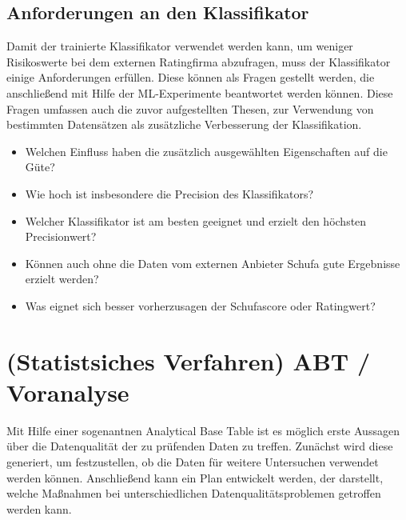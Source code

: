 \subsection{Anforderungen an den Klassifikator}
Damit der trainierte Klassifikator verwendet werden kann, um weniger Risikoswerte bei dem externen Ratingfirma abzufragen, muss der Klassifikator einige Anforderungen erfüllen.
Diese können als Fragen gestellt werden, die anschließend mit Hilfe der ML-Experimente beantwortet werden können. 
Diese Fragen umfassen auch die zuvor aufgestellten Thesen, zur Verwendung von bestimmten Datensätzen als zusätzliche Verbesserung der Klassifikation. 

\begin{itemize}
 \item Welchen Einfluss haben die zusätzlich ausgewählten Eigenschaften auf die Güte?
 \item Wie hoch ist insbesondere die Precision des Klassifikators?
 \item Welcher Klassifikator ist am besten geeignet und erzielt den höchsten Precisionwert?
 \item Können auch ohne die Daten vom externen Anbieter Schufa gute Ergebnisse erzielt werden?
 \item Was eignet sich besser vorherzusagen der Schufascore oder Ratingwert?
\end{itemize}



\section{(Statistsiches Verfahren) ABT / Voranalyse}
Mit Hilfe einer sogenantnen Analytical Base Table ist es möglich erste Aussagen über die Datenqualität der zu prüfenden Daten zu treffen.
Zunächst wird diese generiert, um festzustellen, ob die Daten für weitere Untersuchen verwendet werden können.
Anschließend kann ein Plan entwickelt werden, der darstellt, welche Maßnahmen bei unterschiedlichen Datenqualitätsproblemen getroffen werden kann.


